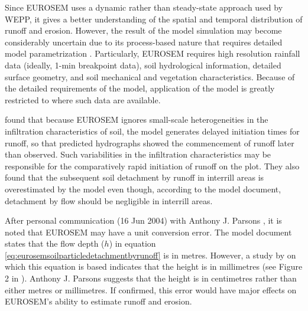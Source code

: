 Since EUROSEM uses a dynamic rather than steady-state approach used by WEPP, it
gives a better understanding of the spatial and temporal distribution of runoff
and erosion. However, the result of the model simulation may become considerably
uncertain due to its process-based nature that requires detailed model
parametrization \citep{quinton1998-65}. Particularly, EUROSEM requires high
resolution rainfall data (ideally, 1-min breakpoint data), soil hydrological
information, detailed surface geometry, and soil mechanical and vegetation
characteristics. Because of the detailed requirements of the model, application
of the model is greatly restricted to where such data are available.

\citet{parsons2000-181} found that because EUROSEM ignores small-scale
heterogeneities in the infiltration characteristics of soil, the model generates
delayed initiation times for runoff, so that predicted hydrographs showed the
commencement of runoff later than observed. Such variabilities in the
infiltration characteristics may be responsible for the comparatively rapid
initiation of runoff on the plot. They also found that the subsequent soil
detachment by runoff in interrill areas is overestimated by the model even
though, according to the model document, detachment by flow should be negligible
in interrill areas.

After personal communication (16 Jun 2004) with Anthony J. Parsons , it is noted
that EUROSEM may have a unit conversion error. The model document states that
the flow depth ($h$) in equation \ref{eq:eurosemsoilparticledetachmentbyrunoff}
is in metres. However, a study by \citet{torri1987-149} on which this equation
is based indicates that the height is in millimetres (see Figure 2 in
\citet{torri1987-149}). Anthony J. Parsons suggests that the height is in
centimetres rather than either metres or millimetres. If confirmed, this error
would have major effects on EUROSEM's ability to estimate runoff and erosion.


